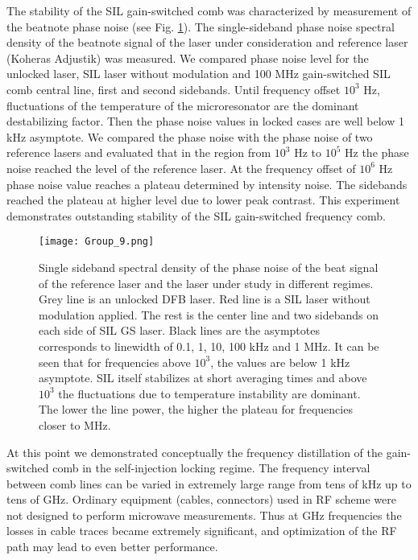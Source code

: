 \documentclass[a4paper, amsfonts, amssymb, amsmath, reprint, showkeys, nofootinbib, twoside,longbibliography, aps]{revtex4-1}
\begin{document}
The stability of the SIL gain-switched comb was characterized by measurement of the beatnote phase noise (see Fig. \ref{fig:phaseNoise}). The single-sideband phase noise spectral density of the beatnote signal of the laser under consideration and reference laser (Koheras Adjustik) was measured. We compared phase noise level for the unlocked laser, SIL laser without modulation and 100 MHz gain-switched SIL comb central line, first and second sidebands. Until frequency offset $10^3$ Hz, fluctuations of the temperature of the microresonator are the dominant destabilizing factor. Then the phase noise values in locked cases are well below 1 kHz asymptote. We compared the phase noise with the phase noise of two reference lasers and evaluated that in the region from $10^3$ Hz to $10^5$ Hz the phase noise reached the level of the reference laser. At the frequency offset of $10^6$ Hz phase noise value reaches a plateau determined by intensity noise. The sidebands reached the plateau at higher level due to lower peak contrast. This experiment demonstrates outstanding stability of the SIL gain-switched frequency comb.

\begin{figure}[hbtp!]
\centering
\texttt{[image: Group\_9.png]}
\caption{Single sideband spectral density of the phase noise of the beat signal of the reference laser and the laser under study in different regimes. Grey line is an unlocked DFB laser. Red line is a SIL laser without modulation applied. The rest is the center line and two sidebands on each side of SIL GS laser. Black lines are the asymptotes corresponds to linewidth of 0.1, 1, 10, 100 kHz and 1 MHz. It can be seen that for frequencies above $10^3$, the values are below 1 kHz asymptote. SIL itself stabilizes at short averaging times and above $10^3$ the fluctuations due to temperature instability are dominant. The lower the line power, the higher the plateau for frequencies closer to MHz. }
\label{fig:phaseNoise}
\end{figure}



At this point we demonstrated conceptually the frequency distillation of the gain-switched comb in the self-injection locking regime. The frequency interval between comb lines can be varied in extremely large range from tens of kHz up to tens of GHz. Ordinary equipment (cables, connectors) used in RF scheme were not designed to perform microwave measurements. Thus at GHz frequencies the losses in cable traces became extremely significant, and optimization of the RF path may lead to even better performance.
\end{document}
